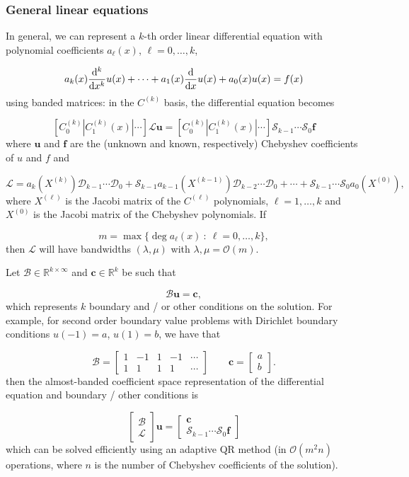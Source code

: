 \documentclass[12pt,a4paper]{article}
\begin{document}
\subsubsection{General linear equations}
In general, we can represent a $k$-th order linear differential equation with polynomial coefficients $a_{\ell}(x)$, $\ell = 0, \ldots, k$, 

\[
a_k(x)\frac{{\rm d}^k}{{\rm d}x^k}u(x) + \cdots + a_1(x)\frac{{\rm d}}{{\rm d}x}u(x) + a_0(x)u(x) = f(x)
\]
using banded matrices: in the $C^{(k)}$ basis, the differential equation becomes

\[
\left[ C_0^{(k)} | C_1^{(k)}(x) | \cdots    \right]\mathcal{L}\mathbf{u} = \left[ C_0^{(k)} | C_1^{(k)}(x) | \cdots    \right]\mathcal{S}_{k-1}\cdots\mathcal{S}_0\mathbf{f}
\]
where $\mathbf{u}$ and $\mathbf{f}$ are the (unknown and known, respectively) Chebyshev coefficients of $u$ and $f$ and 

\[
\mathcal{L} = a_k(X^{(k)})\mathcal{D}_{k-1}\cdots\mathcal{D}_0 + \mathcal{S}_{k-1}a_{k-1}(X^{(k-1)})\mathcal{D}_{k-2}\cdots\mathcal{D}_0 + \cdots + \mathcal{S}_{k-1}\cdots\mathcal{S}_{0}a_{0}(X^{(0)}),
\]
where $X^{(\ell)}$ is the Jacobi matrix of the $C^{(\ell)}$ polynomials, $\ell = 1, \ldots, k$ and  $X^{(0)}$ is the Jacobi matrix of the Chebyshev polynomials.  If 

\[
m = \max \{ \deg a_{\ell}(x) \: : \: \ell = 0, \ldots, k\},
\]
then $\mathcal{L}$ will have bandwidths $(\lambda, \mu)$ with $\lambda, \mu = \mathcal{O}(m)$. 

Let $\mathcal{B} \in \mathbb{R}^{k\times \infty}$ and $\mathbf{c} \in \mathbb{R}^{k}$ be such that 

\[
\mathcal{B}\mathbf{u} = \mathbf{c},
\]
which represents $k$ boundary and / or other conditions on the solution.  For example, for second order boundary value problems with Dirichlet boundary conditions $u(-1) = a$, $u(1)= b$, we have that 

\[
\mathcal{B} = 
\begin{bmatrix}
1 & -1 & 1 & -1 & \cdots  \\
1 &  1  & 1 & 1 & \cdots
\end{bmatrix} \qquad
\mathbf{c} = 
\begin{bmatrix} a \\
b 
\end{bmatrix}.
\]
then the almost-banded coefficient space representation of the differential equation and boundary / other conditions is

\[
\begin{bmatrix}
\mathcal{B} \\
\mathcal{L} 
\end{bmatrix}\mathbf{u} = 
\begin{bmatrix}
\mathbf{c} \\
\mathcal{S}_{k-1}\cdots\mathcal{S}_0\mathbf{f}
\end{bmatrix}
\]
which can be solved efficiently using an adaptive QR method (in $\mathcal{O}(m^2n)$ operations, where $n$ is the number of Chebyshev coefficients of the solution).  
\end{document}

